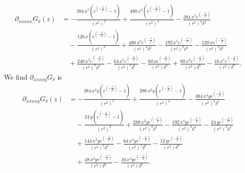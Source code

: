\documentclass[12pt]{amsart}
\begin{document}
\begin{align*}
  \partial_{xxxxx}G_\delta(z) &= 
  - \frac{384 \, x^{5} {\left(e^{\left(-\frac{r^{2}}{\delta^{2}}\right)} - 1\right)}}{{\left(r^{2}\right)}^{5}} 
  + \frac{480 \, x^{3} {\left(e^{\left(-\frac{r^{2}}{\delta^{2}}\right)} - 1\right)}}{{\left(r^{2}\right)}^{4}} 
  - \frac{384 \, x^{5} e^{\left(-\frac{r^{2}}{\delta^{2}}\right)}}{{\left(r^{2}\right)}^{4} \delta^{2}} \\
  &\quad - \frac{120 \, x {\left(e^{\left(-\frac{r^{2}}{\delta^{2}}\right)} - 1\right)}}{{\left(r^{2}\right)}^{3}} 
  + \frac{480 \, x^{3} e^{\left(-\frac{r^{2}}{\delta^{2}}\right)}}{{\left(r^{2}\right)}^{3} \delta^{2}} 
  - \frac{192 \, x^{5} e^{\left(-\frac{r^{2}}{\delta^{2}}\right)}}{{\left(r^{2}\right)}^{3} \delta^{4}} 
  - \frac{120 \, x e^{\left(-\frac{r^{2}}{\delta^{2}}\right)}}{{\left(r^{2}\right)}^{2} \delta^{2}} \\
  &\quad + \frac{240 \, x^{3} e^{\left(-\frac{r^{2}}{\delta^{2}}\right)}}{{\left(r^{2}\right)}^{2} \delta^{4}} 
  - \frac{64 \, x^{5} e^{\left(-\frac{r^{2}}{\delta^{2}}\right)}}{{\left(r^{2}\right)}^{2} \delta^{6}} 
  - \frac{60 \, x e^{\left(-\frac{r^{2}}{\delta^{2}}\right)}}{{\left(r^{2}\right)} \delta^{4}} 
  + \frac{80 \, x^{3} e^{\left(-\frac{r^{2}}{\delta^{2}}\right)}}{{\left(r^{2}\right)} \delta^{6}} 
  - \frac{16 \, x^{5} e^{\left(-\frac{r^{2}}{\delta^{2}}\right)}}{{\left(r^{2}\right)} \delta^{8}}.
\end{align*}
We find $ \partial_{xxxxy}G_\delta$ is
\begin{align*}
  \partial_{xxxxy}G_\delta(z) &= 
  -\frac{384 \, x^{4} y {\left(e^{\left(-\frac{r^{2}}{\delta^{2}}\right)} - 1\right)}}{{\left(r^{2}\right)}^{5}} 
  + \frac{288 \, x^{2} y {\left(e^{\left(-\frac{r^{2}}{\delta^{2}}\right)} - 1\right)}}{{\left(r^{2}\right)}^{4}} 
  - \frac{384 \, x^{4} y e^{\left(-\frac{r^{2}}{\delta^{2}}\right)}}{{\left(r^{2}\right)}^{4} \delta^{2}} \\
  &\quad - \frac{24 \, y {\left(e^{\left(-\frac{r^{2}}{\delta^{2}}\right)} -1\right)}}{{\left(r^{2}\right)}^{3}} 
  + \frac{288 \, x^{2} y e^{\left(-\frac{r^{2}}{\delta^{2}}\right)}}{{\left(r^{2}\right)}^{3} \delta^{2}} 
  - \frac{192 \, x^{4} y e^{\left(-\frac{r^{2}}{\delta^{2}}\right)}}{{\left(r^{2}\right)}^{3} \delta^{4}} 
  - \frac{24 \, y e^{\left(-\frac{r^{2}}{\delta^{2}}\right)}}{{\left(r^{2}\right)}^{2} \delta^{2}} \\
  &\quad + \frac{144 \, x^{2} y e^{\left(-\frac{r^{2}}{\delta^{2}}\right)}}{{\left(r^{2}\right)}^{2} \delta^{4}} 
  - \frac{64 \, x^{4} y e^{\left(-\frac{r^{2}}{\delta^{2}}\right)}}{{\left(r^{2}\right)}^{2} \delta^{6}} 
  - \frac{12 \, y e^{\left(-\frac{r^{2}}{\delta^{2}}\right)}}{{\left(r^{2}\right)} \delta^{4}} \\
  &\quad + \frac{48 \, x^{2} y e^{\left(-\frac{r^{2}}{\delta^{2}}\right)}}{{\left(r^{2}\right)} \delta^{6}} 
  - \frac{16 \, x^{4} y e^{\left(-\frac{r^{2}}{\delta^{2}}\right)}}{{\left(r^{2}\right)} \delta^{8}}.
\end{align*}
\end{document}
